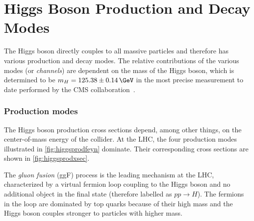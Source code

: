 

\section{Higgs Boson Production and Decay Modes}
\label{subsec:higgschannels}
The Higgs boson directly couples to all massive particles and therefore has various production and decay modes.
The relative contributions of the various modes (or \emph{channels}) are dependent on the mass of the Higgs boson, which is determined to be $m_H = 125.38 \pm 0.14\,\GeV$ in the most precise measurement to date performed by the CMS collaboration~\cite{CMS-HIG-19-004}.

\subsubsection{Production modes} 
The Higgs boson production cross sections depend, among other things, on the center-of-mass energy of the collider.
At the LHC, the four production modes illustrated in \cref{fig:higgsprodfeyn} dominate.
Their corresponding cross sections are shown in \cref{fig:higgsprodxsec}.

The \emph{gluon fusion} (ggF) process is the leading mechanism at the LHC, characterized by a virtual fermion loop coupling to the Higgs boson and no additional object in the final state (therefore labelled as $pp\rightarrow H$). 
The fermions in the loop are dominated by top quarks because of their high mass and the Higgs boson couples stronger to particles with higher mass. 

